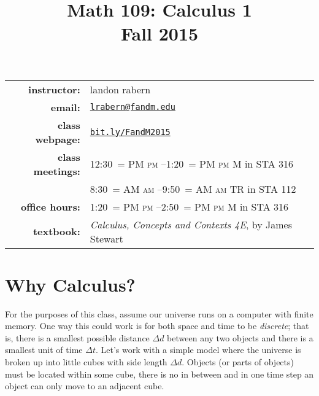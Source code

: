 \documentclass[12pt]{article}
\title{Math 109: Calculus 1\\ \bigskip\small{Fall 2015}}
\date{}
\makeatletter
\DeclareRobustCommand{\maybefakesc}[1]{%
  \ifnum\pdfstrcmp{\f@series}{\bfdefault}=\z@
    {\fontsize{\dimexpr0.8\dimexpr\f@size pt\relax}{0}\selectfont\uppercase{#1}}%
  \else
    \textsc{#1}%
  \fi
}
\newcommand\AM{\,\maybefakesc{am}\xspace}
\newcommand\PM{\,\maybefakesc{pm}\xspace}
\makeatother
\begin{document}
\maketitle

\begin{tabular}{r l}
\textbf{instructor:}& landon rabern\\
\textbf{email:}& \href{mailto:lrabern@fandm.edu}{\nolinkurl{lrabern@fandm.edu}}\\
\textbf{class webpage:}& \href{http://bit.ly/FandM2015}{\nolinkurl{bit.ly/FandM2015}}\\
\textbf{class meetings:}& 12:30\PM--1:20\PM M in STA 316 \\
& 8:30\AM--9:50\AM TR in STA 112\\
\textbf{office hours:}& 1:20\PM--2:50\PM M in STA 316\\
\textbf{textbook:}&\textit{Calculus, Concepts and Contexts 4E}, by James Stewart\\
\end{tabular}

\bigskip

\section*{Why Calculus?}
For the purposes of this class, assume our universe runs on a computer with finite memory.  One way this could work is for both space and time to be \emph{discrete}; that is, there is a smallest possible distance $\Delta d$ between any two objects and there is a smallest unit of time $\Delta t$.  Let's work with a simple model where the universe is broken up into little cubes with side length $\Delta d$.  Objects (or parts of objects) must be located within some cube, there is no in between and in one time step an object can only move to an adjacent cube.  
\end{document}
